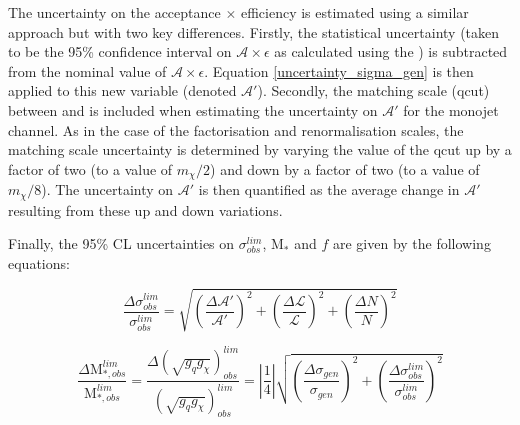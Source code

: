 \begin{flushleft}
\bigskip

The uncertainty on the acceptance $\times$ efficiency is estimated using a similar approach but with two key differences. Firstly, the statistical uncertainty (taken to be the 95\% confidence interval on $\mathcal{A}\times\epsilon$ as calculated using the ) is subtracted from the nominal value of $\mathcal{A}\times\epsilon$. Equation \ref{uncertainty_sigma_gen} is then applied to this new variable (denoted $\mathcal{A}'$). Secondly, the matching scale (qcut) between \MG and \PYTHIA is included when estimating the uncertainty on $\mathcal{A}'$ for the monojet channel. As in the case of the factorisation and renormalisation scales, the matching scale uncertainty is determined by varying the value of the qcut up by a factor of two (to a value of $m_{\chi}/2$) and down by a factor of two (to a value of $m_{\chi}/8$). The uncertainty on $\mathcal{A}'$ is then quantified as the average change in $\mathcal{A}'$ resulting from these up and down variations. 
\bigskip

Finally, the 95\% CL uncertainties on $\sigma_{obs}^{lim}$, M$_{*}$ and $f$ are given by the following equations:

\begin{equation}
\label{uncertainty_sigma_lim}
\frac{\Delta \sigma_{obs}^{lim}}{\sigma_{obs}^{lim}} = \sqrt{\left(\frac{\Delta \mathcal{A}'}{\mathcal{A}'}\right)^{2} + \left(\frac{\Delta \mathcal{L}}{\mathcal{L}}\right)^{2} + \left(\frac{\Delta N}{N}\right)^{2}}
\end{equation}

\begin{equation}
\label{uncertainty_M_star}
\frac{\Delta \mbox{M}_{*,obs}^{lim}}{\mbox{M}_{*,obs}^{lim}} = \frac{\Delta (\sqrt{g_{q}g_{\chi}})_{obs}^{lim}}{(\sqrt{g_{q}g_{\chi}})_{obs}^{lim}} = \left|\frac{1}{4}\right|\sqrt{\left(\frac{\Delta \sigma_{gen}}{\sigma_{gen}}\right)^{2} + \left(\frac{\Delta \sigma_{obs}^{lim}}{\sigma_{obs}^{lim}}\right)^{2}}
\end{equation}
\end{flushleft}